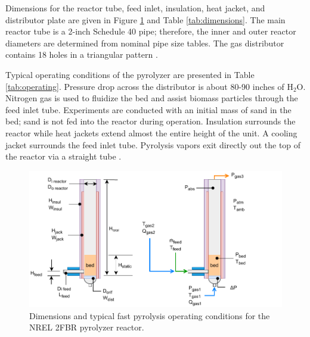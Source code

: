 \documentclass[12pt,titlepage]{article}
\begin{document}
Dimensions for the reactor tube, feed inlet, insulation, heat jacket, and distributor plate are given in Figure \ref{fig:pyrolyzer2} and Table \ref{tab:dimensions}. The main reactor tube is a 2-inch Schedule 40 pipe; therefore, the inner and outer reactor diameters are determined from nominal pipe size tables. The gas distributor contains 18 holes in a triangular pattern \cite{French-2019}.

Typical operating conditions of the pyrolyzer are presented in Table \ref{tab:operating}. Pressure drop across the distributor is about 80-90 inches of H$_2$O. Nitrogen gas is used to fluidize the bed and assist biomass particles through the feed inlet tube. Experiments are conducted with an initial mass of sand in the bed; sand is not fed into the reactor during operation. Insulation surrounds the reactor while heat jackets extend almost the entire height of the unit. A cooling jacket surrounds the feed inlet tube. Pyrolysis vapors exit directly out the top of the reactor via a straight tube \cite{French-2019}.

\begin{figure}[H]
    \centering
    \includegraphics[width=\textwidth]{figures/pyrolyzer2.pdf}
    \caption{Dimensions and typical fast pyrolysis operating conditions for the NREL 2FBR pyrolyzer reactor.}
    \label{fig:pyrolyzer2}
\end{figure}
\end{document}
